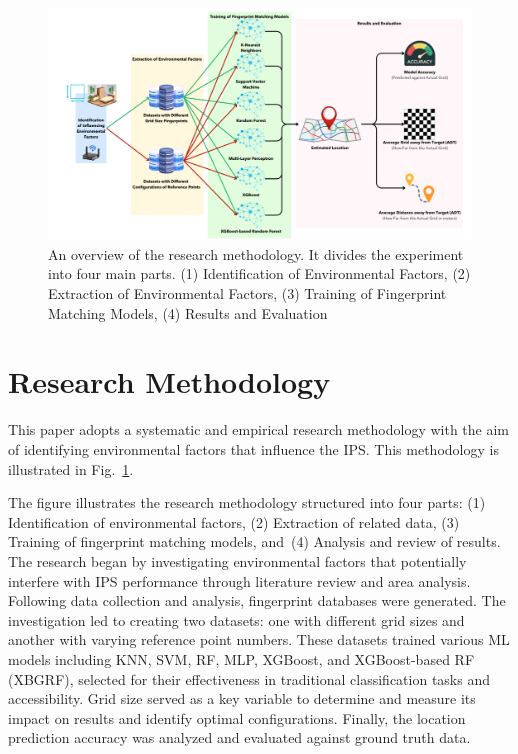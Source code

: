 \documentclass[runningheads]{llncs}
\begin{document}
\begin{figure}
	\includegraphics[width=\textwidth]{meth1.png}
	\caption{An overview of the research methodology. It divides the experiment into four main parts. (1) Identification of Environmental Factors, (2) Extraction of Environmental Factors, (3) Training of Fingerprint Matching Models, (4) Results and Evaluation}
	\label{fig:graph_step}
\end{figure}

\section{Research Methodology}
This paper adopts a systematic and empirical research methodology with the aim of identifying environmental factors that influence the IPS. This methodology is illustrated in Fig.~\ref{fig:graph_step}.

The figure illustrates the research methodology structured into four parts: (1) Identification of environmental factors, (2) Extraction of related data, (3) Training of fingerprint matching models, and~(4) Analysis and review of results. The research began by investigating environmental factors that potentially interfere with IPS performance through literature review and area analysis. Following data collection and analysis, fingerprint databases were generated. The investigation led to creating two datasets: one with different grid sizes and another with varying reference point numbers. These datasets trained various ML models including KNN, SVM, RF, MLP, XGBoost, and XGBoost-based RF (XBGRF), selected for their effectiveness in traditional classification tasks and accessibility. Grid size served as a key variable to determine and measure its impact on results and identify optimal configurations. Finally, the location prediction accuracy was analyzed and evaluated against ground truth data.
\end{document}
